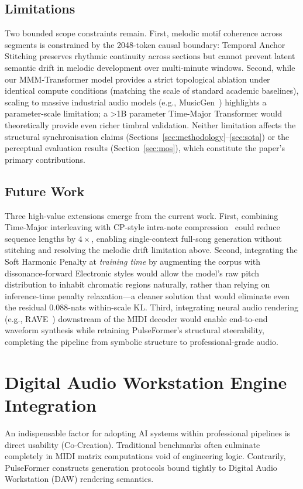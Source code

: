 \documentclass[conference]{IEEEtran}
\begin{document}
\subsection*{Limitations}
Two bounded scope constraints remain.
First, melodic motif coherence across segments is constrained by the
2048-token causal boundary: Temporal Anchor Stitching preserves rhythmic
continuity across sections but cannot prevent latent semantic drift in
melodic development over multi-minute windows.
Second, while our MMM-Transformer model provides a strict topological ablation under identical compute conditions (matching the scale of standard academic baselines), scaling to massive industrial audio models (e.g., MusicGen~\cite{copet2023simple}) highlights a parameter-scale limitation; a >1B parameter Time-Major Transformer would theoretically provide even richer timbral validation.
Neither limitation affects the structural synchronisation claims
(Sections~\ref{sec:methodology}--\ref{sec:sota}) or the perceptual evaluation results
(Section~\ref{sec:mos}), which constitute the paper's primary contributions.

\subsection*{Future Work}
Three high-value extensions emerge from the current work.
First, combining Time-Major interleaving with CP-style intra-note
compression~\cite{hsiao2021compound} could reduce sequence lengths
by $4\times$, enabling single-context full-song generation without
stitching and resolving the melodic drift limitation above.
Second, integrating the Soft Harmonic Penalty at \textit{training time}
by augmenting the corpus with dissonance-forward Electronic styles would
allow the model's raw pitch distribution to inhabit chromatic regions
naturally, rather than relying on inference-time penalty relaxation---a
cleaner solution that would eliminate even the residual 0.088-nats
within-scale KL.
Third, integrating neural audio rendering (e.g.,
RAVE~\cite{caillon2021rave}) downstream of the MIDI decoder would enable
end-to-end waveform synthesis while retaining PulseFormer's structural
steerability, completing the pipeline from symbolic structure to
professional-grade audio.


\appendices
\section{Digital Audio Workstation Engine Integration}
An indispensable factor for adopting AI systems within professional pipelines is direct usability (Co-Creation). Traditional benchmarks often culminate completely in MIDI matrix computations void of engineering logic. Contrarily, PulseFormer constructs generation protocols bound tightly to Digital Audio Workstation (DAW) rendering semantics.
\end{document}
